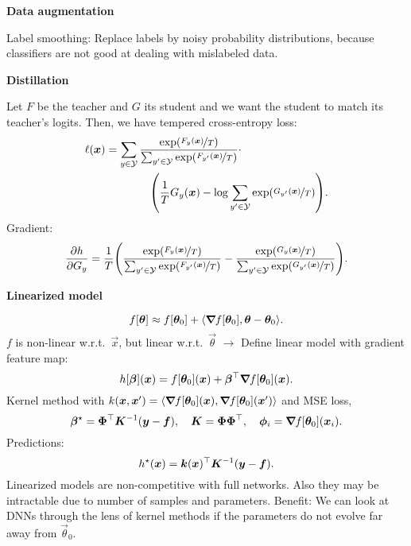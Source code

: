 \documentclass[10pt]{article}
\newenvironment{topic}[1]
{\textbf{\sffamily \colorbox{black}{\rlap{\textbf{\textcolor{white}{#1}}}\hspace{\linewidth}\hspace{-2\fboxsep}}}}
{}
\newenvironment{subtopic}[1]
{\begin{center}\textbf{\sffamily #1}\end{center}}
{}
\begin{document}
\begin{multicols*}{3}
\begin{topic}{Tricks of the trade}
\begin{subtopic}{Data augmentation}
            Label smoothing: Replace labels by noisy probability distributions, because classifiers are not
            good at dealing with mislabeled data.
        \end{subtopic}

        \begin{subtopic}{Distillation}
            Let $F$ be the teacher and $G$ its student and we want the student to match its teacher's
            logits. Then, we have tempered cross-entropy loss:
            \begin{align*}
                \ell(\vec{x}) & = \sum_{y \in \mathcal{Y}} \frac{\exp(\nicefrac{F_y(\vec{x})}{T})}{\sum_{y' \in \mathcal{Y}} \exp(\nicefrac{F_{y'}(\vec{x})}{T})} \cdot \\
                              & \quad \quad \quad \quad \lft( \frac{1}{T} G_y(\vec{x}) - \log \sum_{y' \in \mathcal{Y}} \exp(\nicefrac{G_{y'}(\vec{x})}{T}) \rgt).
            \end{align*}
            Gradient: \[
                \pdv{h}{G_y} = \frac{1}{T} \lft( \frac{\exp(\nicefrac{F_y(\vec{x})}{T})}{\sum_{y' \in \mathcal{Y}} \exp(\nicefrac{F_{y'}(\vec{x})}{T})} - \frac{\exp(\nicefrac{G_y(\vec{x})}{T})}{\sum_{y' \in \mathcal{Y}} \exp(\nicefrac{G_{y'}(\vec{x})}{T})} \rgt).
            \]
        \end{subtopic}

    \end{topic}

    \begin{topic}{Neural tangent kernel}

        \begin{subtopic}{Linearized model}
            \[
                f[\bm{\theta}] \approx f[\bm{\theta}_0] + \langle \bm{\nabla}_{\! } f[\bm{\theta}_0], \bm{\theta} - \bm{\theta}_0 \rangle.
            \]
            $f$ is non-linear w.r.t.\ $\vec{x}$, but linear w.r.t.\ $\vec{\theta}$ $\rightarrow$ Define linear model with gradient feature map: \[
                h[\bm{\beta}](\bm{x}) = f[\bm{\theta}_0](\bm{x}) + \bm{\beta}^\top \bm{\nabla}_{\! } f[\bm{\theta}_0](\bm{x}).
            \]
            Kernel method with $k(\bm{x}, \bm{x}') = \langle \bm{\nabla}_{\! } f[\bm{\theta}_0](\bm{x}),
                \bm{\nabla}_{\! } f[\bm{\theta}_0](\bm{x}') \rangle$ and MSE loss, \[
                \bm{\beta}^\star = \bm{\Phi}^\top \bm{K}^{-1} (\bm{y}-\bm{f}), \quad \bm{K} = \bm{\Phi} \bm{\Phi}^\top, \quad \bm{\phi}_i = \bm{\nabla}_{\! } f[\bm{\theta}_0](\bm{x}_i).
            \]
            Predictions: \[
                h^\star(\bm{x}) = \bm{k}(\bm{x})^\top \bm{K}^{-1} (\bm{y} - \bm{f}).
            \]
            Linearized models are non-competitive with full networks. Also they may be intractable due to
            number of samples and parameters. Benefit: We can look at DNNs through the lens of kernel methods
            if the parameters do not evolve far away from $\vec{\theta}_0$.
        \end{subtopic}


\end{topic}
\end{multicols*}
\end{document}
